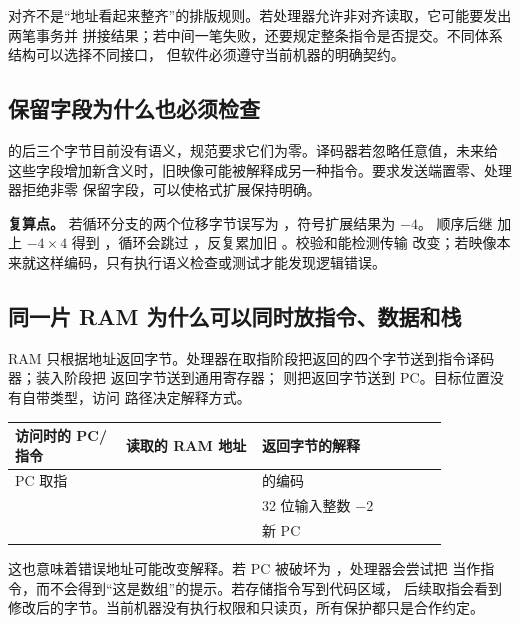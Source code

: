 对齐不是“地址看起来整齐”的排版规则。若处理器允许非对齐读取，它可能要发出两笔事务并
拼接结果；若中间一笔失败，还要规定整条指令是否提交。不同体系结构可以选择不同接口，
但软件必须遵守当前机器的明确契约。

\subsection{保留字段为什么也必须检查}

 的后三个字节目前没有语义，规范要求它们为零。译码器若忽略任意值，未来给
这些字段增加新含义时，旧映像可能被解释成另一种指令。要求发送端置零、处理器拒绝非零
保留字段，可以使格式扩展保持明确。

\begin{problemframe}
\textbf{复算点。} 若循环分支的两个位移字节误写为 ，符号扩展结果为 \(-4\)。
顺序后继  加上 \(-4\times4\) 得到
，循环会跳过 ，反复累加旧 。校验和能检测传输
改变；若映像本来就这样编码，只有执行语义检查或测试才能发现逻辑错误。
\end{problemframe}

\subsection{同一片 RAM 为什么可以同时放指令、数据和栈}

RAM 只根据地址返回字节。处理器在取指阶段把返回的四个字节送到指令译码器；装入阶段把
返回字节送到通用寄存器； 则把返回字节送到 PC。目标位置没有自带类型，访问
路径决定解释方式。

\begin{longtable}{|L{0.22\linewidth}|L{0.27\linewidth}|L{0.37\linewidth}|}
\hline
{}
访问时的 PC/指令 & 读取的 RAM 地址 & 返回字节的解释 \\ \hline
PC 取指 &  &  的编码 \\ \hline
{} &  & 32 位输入整数 \(-2\) \\ \hline
{} &  & 新 PC  \\ \hline
\end{longtable}

这也意味着错误地址可能改变解释。若 PC 被破坏为 ，处理器会尝试把
 当作指令，而不会得到“这是数组”的提示。若存储指令写到代码区域，
后续取指会看到修改后的字节。当前机器没有执行权限和只读页，所有保护都只是合作约定。
